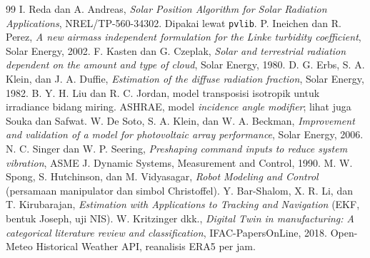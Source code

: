 \documentclass[11pt,a4paper]{article}
\begin{document}
\begin{thebibliography}{99}
\small
{} I. Reda dan A. Andreas, \emph{Solar Position Algorithm for Solar Radiation Applications},
NREL/TP-560-34302. Dipakai lewat \texttt{pvlib}.
 P. Ineichen dan R. Perez, \emph{A new airmass independent formulation for the Linke
turbidity coefficient}, Solar Energy, 2002.
 F. Kasten dan G. Czeplak, \emph{Solar and terrestrial radiation dependent on the amount and
type of cloud}, Solar Energy, 1980.
 D. G. Erbs, S. A. Klein, dan J. A. Duffie, \emph{Estimation of the diffuse radiation fraction},
Solar Energy, 1982.
 B. Y. H. Liu dan R. C. Jordan, model transposisi isotropik untuk irradiance bidang miring.
 ASHRAE, model \emph{incidence angle modifier}; lihat juga Souka dan Safwat.
 W. De Soto, S. A. Klein, dan W. A. Beckman, \emph{Improvement and validation of a model for
photovoltaic array performance}, Solar Energy, 2006.
 N. C. Singer dan W. P. Seering, \emph{Preshaping command inputs to reduce system vibration},
ASME J. Dynamic Systems, Measurement and Control, 1990.
 M. W. Spong, S. Hutchinson, dan M. Vidyasagar, \emph{Robot Modeling and Control}
(persamaan manipulator dan simbol Christoffel).
 Y. Bar-Shalom, X. R. Li, dan T. Kirubarajan, \emph{Estimation with Applications to
Tracking and Navigation} (EKF, bentuk Joseph, uji NIS).
 W. Kritzinger dkk., \emph{Digital Twin in manufacturing: A categorical literature
review and classification}, IFAC-PapersOnLine, 2018.
 Open-Meteo Historical Weather API, reanalisis ERA5 per jam.
\end{thebibliography}
\end{document}
